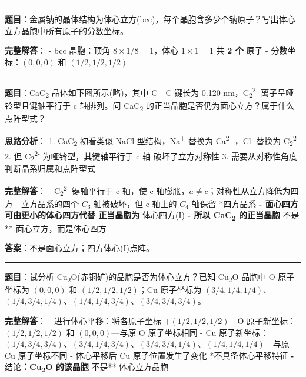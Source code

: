 \begin{center}\rule{0.5\linewidth}{0.5pt}\end{center}

\textbf{题目}：金属钠的晶体结构为体心立方(bcc)，每个晶胞含多少个钠原子？写出体心立方晶胞中所有原子的分数坐标。

\textbf{完整解答}：
- bcc 晶胞：顶角 \(8 \times 1/8 = 1\)，体心 \(1 \times 1 = 1\) \箭 共 \textbf{2 个} 原子
- 分数坐标：\((0, 0, 0)\) 和 \((1/2, 1/2, 1/2)\)

\begin{center}\rule{0.5\linewidth}{0.5pt}\end{center}

\textbf{题目}：CaC\textsubscript{2} 晶体如下图所示(略)，其中 C---C 键长为 0.120 nm，C\textsubscript{2}\textsuperscript{2-} 离子呈哑铃型且键轴平行于 c 轴排列。问 CaC\textsubscript{2} 的正当晶胞是否仍为面心立方？属于什么点阵型式？

\textbf{思路分析}：
1. CaC\textsubscript{2} 初看类似 NaCl 型结构，Na\textsuperscript{+} 替换为 Ca\textsuperscript{2+}，Cl\textsuperscript{-} 替换为 C\textsubscript{2}\textsuperscript{2-}
2. 但 C\textsubscript{2}\textsuperscript{2-} 为哑铃型，其键轴平行于 c 轴 \箭 破坏了立方对称性
3. 需要从对称性角度判断晶系归属和点阵型式

\textbf{完整解答}：
- C\textsubscript{2}\textsuperscript{2-} 键轴平行于 c 轴，使 c 轴膨胀，\(a \neq c\)；对称性从立方降低为四方
- 立方晶系的四个 \(C_3\) 轴被破坏，但 c 轴上的 \(C_4\) 轴保留 \箭 **四方晶系\textbf{
- 面心四方可由更小的体心四方代替 \箭 正当晶胞为 }体心四方(I)\textbf{
- 所以 CaC\textsubscript{2} 的正当晶胞 }不是** 面心立方，而是体心四方

\textbf{答案}：不是面心立方；四方体心(I)点阵。

\begin{center}\rule{0.5\linewidth}{0.5pt}\end{center}

\textbf{题目}：试分析 Cu\textsubscript{2}O(赤铜矿)的晶胞是否为体心立方？已知 Cu\textsubscript{2}O 晶胞中 O 原子坐标为 \((0, 0, 0)\) 和 \((1/2, 1/2, 1/2)\)；Cu 原子坐标为 \((3/4, 1/4, 1/4)\)、\((1/4, 3/4, 1/4)\)、\((1/4, 1/4, 3/4)\)、\((3/4, 3/4, 3/4)\)。

\textbf{完整解答}：
- 进行体心平移：将各原子坐标 \(+(1/2, 1/2, 1/2)\)
- O 原子新坐标：\((1/2, 1/2, 1/2)\) 和 \((0, 0, 0)\)---与原 O 原子坐标相同
- Cu 原子新坐标：\((1/4, 3/4, 3/4)\)、\((3/4, 1/4, 3/4)\)、\((3/4, 3/4, 1/4)\)、\((1/4, 1/4, 1/4)\)---与原 Cu 原子坐标不同
- 体心平移后 Cu 原子位置发生了变化 \箭 **不具备体心平移特征\textbf{
- }结论\textbf{：Cu\textsubscript{2}O 的该晶胞 }不是** 体心立方晶胞

